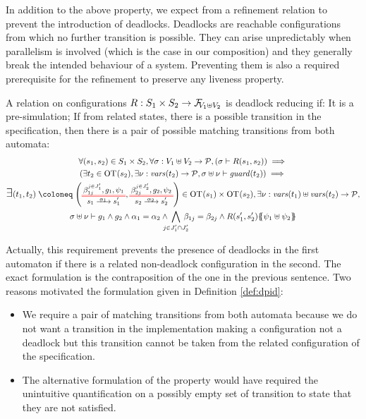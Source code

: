 \documentclass{article}
\begin{document}
In addition to the above property, we expect from a refinement relation to prevent the introduction of deadlocks.
Deadlocks are reachable configurations from which no further transition is possible.
They can arise unpredictably when parallelism is involved (which is the case in our composition) and they generally break the intended behaviour of a system.
Preventing them is also a required prerequisite for the refinement to preserve any liveness property.
\begin{defi}\label{def:dpid}
A relation on configurations \(R: S_1 \times S_2 \to \rformulas[V_1 \uplus V_2]\) is deadlock reducing if:
 It is a pre-simulation;
 If from related states, there is a possible transition in the specification, then there is a pair of possible matching transitions from both automata:
\begin{multline*}
	\forall \mpar{s_1, s_2} \in S_1 \times S_2, \forall \sigma: V_1 \uplus V_2 \to \values, \mpar{\sigma \vdash R\mpar{s_1, s_2}} \implies \\
	\mpar{\exists t_2 \in \fOT{s_2}, \exists \nu: \fvars{t_2} \to \values, \sigma \uplus \nu \vdash \fguard{t_2}} \implies \\
	\bigsymb{\exists} \mpar{t_1, t_2} \defobject \mpar{\OTx{1}{}{1}{1}, \OTx{2}{}{2}{2}} \in \fOT{s_1} \times \fOT{s_2}, \exists \nu: \fvars{t_1} \uplus \fvars{t_2} \to \values, \\
	\sigma \uplus \nu \vdash g_1 \wedge g_2 \wedge \alpha_1 = \alpha_2 \wedge \bigwedge_\subbox{j \in J'_1 \cap J'_2} \beta_{1j} = \beta_{2j} \wedge R\mpar{s'_1, s'_2}\psubst{\psi_1 \uplus \psi_2}
\end{multline*}
\end{defi}
Actually, this requirement prevents the presence of deadlocks in the first automaton if there is a related non-deadlock configuration in the second.
The exact formulation is the contraposition of the one in the previous sentence.
Two reasons motivated the formulation given in Definition \ref{def:dpid}:
\begin{itemize}
\item We require a pair of matching transitions from both automata because we do not want a transition in the implementation making a configuration not a deadlock but this transition cannot be taken from the related configuration of the specification.
\item The alternative formulation of the property would have required the unintuitive quantification on a possibly empty set of transition to state that they are not satisfied.
\end{itemize}
\end{document}
